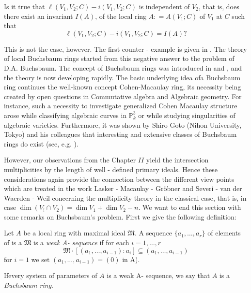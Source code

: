 \setcounter{problem}{5}
\begin{problem}\label{chap0:sec1:prob0.6}
  Is it true that $\ell(V_1, V_2 ; C) - i(V_1, V_2 ; C) $ is
  independent of $V_2$, that is, does there exist an invariant $I(A)$,
  of the local ring $A:  = A(V_1 ;C)$ of $V_1$ at $C$ such that  
  $$
  \ell (V_1, V_2 ; C) - i (V_1, V_2 ; C) = I(A) ?
  $$
\end{problem}

This is not the case, however. The first counter - example is given in
\cite{95}. The theory of local Buchsbaum rings started from this negative
answer to the problem of D.A. Buchsbaum. The concept of Buchsbaum
rings was introduced in \cite{82} and \cite{83}, and the theory is now
developing rapidly. The basic underlying idea of\pageoriginale a Buchsbaum ring
continues the well-known concept Cohen-Macaulay ring, its necessity
being created by open questions in Commutative algebra and Algebraic
geometry. For instance, such a necessity to investigate generalized
Cohen Macaulay structure arose while classifying algebraic curves in
$\mathbb{P}^3_k$ or while studying singularities of algebraic
varieties. Furthermore, it was shown by Shiro Goto (Nihon University,
Tokyo) and his colleagues that interesting and extensive classes of
Buchsbaum rings do exist (see, e.g. \cite{23}).  

However, our observations from the Chapter $II$ yield the intersection
multiplicities by the length of well - defined primary ideals. Hence
these considerations again provide the connection between the
different view points which are treated in the work Lasker - Macaulay
- Gr\"obner and Severi - van der Waerden - Weil concerning the
multiplicity theory in the classical case, that is, in case $\dim (V_!
\cap V_2) = \dim V_1 + \dim V_2 - n$. We want to end this
section with some remarks on Buchsbaum's problem. First we give the
following definition: 

\setcounter{definition}{6}
\begin{definition}\label{chap0:sec1:def0.7}
  Let $A$ be a local ring with maximal ideal $\mathfrak{M}$. A
  sequence $\{ a_1, \ldots,  a_r \}$ of elements of is a
  $\mathfrak{M}$ is a \textit { weak A- 
    sequence } if for each $i = 1, \ldots, r$ 
  $$
  \mathfrak{M} \cdot [(a_1, \ldots,  a_{i-1}):  a_i] \subseteq (a_1,
  \ldots,  a_{i-1}) 
  $$
  for $i=1$ we set $(a_1, \ldots,  a_{i-1}) = (0)$ in A).
\end{definition}

 If\pageoriginale every system of parameters of $A$ is a weak A- sequence, we say
 that $A$ is a \textit{Buchsbaum ring}. 

